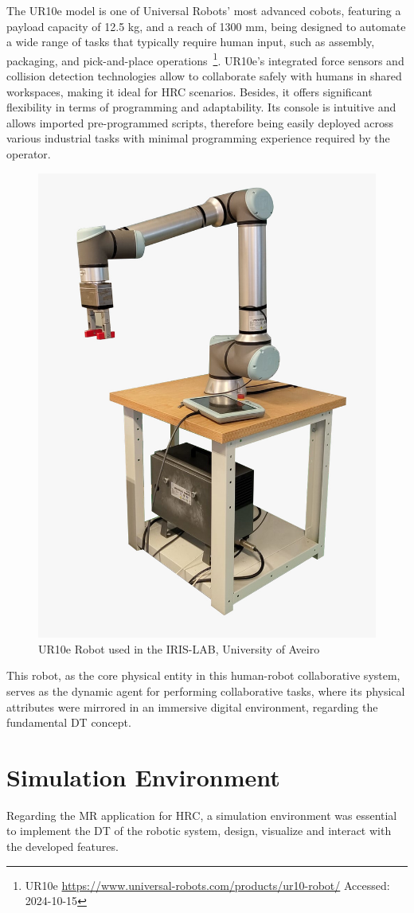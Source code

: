 The UR10e model is one of Universal Robots' most advanced cobots, featuring a payload capacity of 12.5 kg, and a reach of 1300 mm, being designed to automate a wide range of tasks that typically require human input, such as assembly, packaging, and pick-and-place operations~\footnote{UR10e \url{https://www.universal-robots.com/products/ur10-robot/} Accessed: 2024-10-15}. UR10e's integrated force sensors and collision detection technologies allow to collaborate safely with humans in shared workspaces, making it ideal for \ac{HRC} scenarios. Besides, it offers significant flexibility in terms of programming and adaptability. Its console is intuitive and allows imported pre-programmed scripts, therefore being easily deployed across various industrial tasks with minimal programming experience required by the operator.

\begin{figure}[h]
    \centering
    \includegraphics[width=0.4\linewidth]{figs/ur10e.jpeg}
    \caption{UR10e Robot used in the IRIS-LAB, University of Aveiro}
    \label{f:ur10e_iris}
\end{figure}

This robot, as the core physical entity in this human-robot collaborative system, serves as the dynamic agent for performing collaborative tasks, where its physical attributes were mirrored in an immersive digital environment, regarding the fundamental \ac{DT} concept.

\section{Simulation Environment}

Regarding the \ac{MR} application for \ac{HRC}, a simulation environment was essential to implement the \ac{DT} of the robotic system, design, 
visualize and interact with the developed features.

